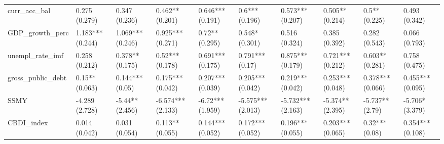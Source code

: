 \begin{table}[ht]
\begin{tabular}{llllllllll}
  curr\_acc\_bal & 0.275 (0.279) & 0.347 (0.236) & 0.462** (0.201) & 0.646*** (0.191) & 0.6*** (0.196) & 0.573*** (0.207) & 0.505** (0.214) & 0.5** (0.225) & 0.493 (0.342) \\ 
  GDP\_growth\_perc & 1.183*** (0.244) & 1.069*** (0.246) & 0.925*** (0.271) & 0.72** (0.295) & 0.548* (0.301) & 0.516 (0.324) & 0.385 (0.392) & 0.282 (0.543) & 0.066 (0.793) \\ 
  unempl\_rate\_imf & 0.258 (0.212) & 0.378** (0.175) & 0.52*** (0.178) & 0.691*** (0.175) & 0.791*** (0.17) & 0.875*** (0.179) & 0.721*** (0.212) & 0.603** (0.281) & 0.758 (0.475) \\ 
  gross\_public\_debt & 0.15** (0.063) & 0.144*** (0.05) & 0.175*** (0.042) & 0.207*** (0.039) & 0.205*** (0.042) & 0.219*** (0.042) & 0.253*** (0.048) & 0.378*** (0.066) & 0.455*** (0.095) \\ 
  SSMY & -4.289 (2.728) & -5.44** (2.456) & -6.574*** (2.133) & -6.72*** (1.959) & -5.575*** (2.013) & -5.732*** (2.163) & -5.374** (2.395) & -5.737** (2.79) & -5.706* (3.379) \\ 
  CBDI\_index & 0.014 (0.042) & 0.031 (0.054) & 0.113** (0.055) & 0.144*** (0.052) & 0.172*** (0.052) & 0.196*** (0.055) & 0.203*** (0.065) & 0.32*** (0.08) & 0.354*** (0.108) \\ 
   \bottomrule
\end{tabular}
\endgroup
\end{table}
